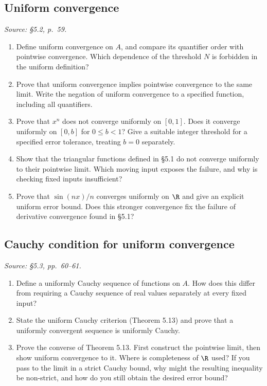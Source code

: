 \subsection{Uniform convergence}
\textit{Source: \S5.2, p.~59.}

\begin{enumerate}[resume]
  \item Define uniform convergence on \(A\), and compare its
    quantifier order with pointwise convergence. Which dependence
    of the threshold \(N\) is forbidden in the uniform definition?

  \item Prove that uniform convergence implies pointwise convergence
    to the same limit. Write the negation of uniform convergence
    to a specified function, including all quantifiers.

  \item Prove that \(x^n\) does not converge uniformly on \([0,1]\).
    Does it converge uniformly on \([0,b]\) for \(0\leq b<1\)?
    Give a suitable integer threshold for a specified error tolerance,
    treating \(b=0\) separately.

  \item Show that the triangular functions defined in \S5.1 do not
    converge uniformly to their pointwise limit. Which moving input
    exposes the failure, and why is checking fixed inputs insufficient?

  \item Prove that \(\sin(nx)/n\) converges uniformly on \(\R\)
    and give an explicit uniform error bound.
    Does this stronger convergence fix the failure of derivative
    convergence found in \S5.1?
\end{enumerate}

\subsection{Cauchy condition for uniform convergence}
\textit{Source: \S5.3, pp.~60--61.}

\begin{enumerate}[resume]
  \item Define a uniformly Cauchy sequence of functions on \(A\).
    How does this differ from requiring a Cauchy sequence of real
    values separately at every fixed input?

  \item State the uniform Cauchy criterion (Theorem 5.13) and prove
    that a uniformly convergent sequence is uniformly Cauchy.

  \item Prove the converse of Theorem 5.13. First construct the
    pointwise limit, then show uniform convergence to it.
    Where is completeness of \(\R\) used? If you pass to the
    limit in a strict Cauchy bound, why might the resulting inequality
    be non-strict, and how do you still obtain the desired error bound?
\end{enumerate}


